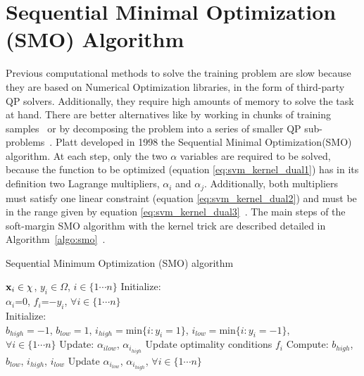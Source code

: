\documentclass{llncs}
\begin{document}
\section{Sequential Minimal Optimization (SMO) Algorithm }
\label{sec:svm_smo}
Previous computational methods to solve the training problem are slow because they are based on Numerical Optimization libraries, in the form of third-party QP solvers. Additionally, they require high amounts of memory to solve the task at hand. There are better alternatives like by working in chunks of training samples~\cite{Vapnik1995} or by decomposing the problem into a series of smaller QP sub-problems~\cite{Osuna1997,Platt1998}.
Platt developed in 1998 the Sequential Minimal Optimization(SMO) algorithm.
At each step, only the two $\alpha$ variables are required to be solved, because the function to be optimized (equation \ref{eq:svm_kernel_dual1}) has in its definition
two Lagrange multipliers, $\alpha_i$ and $\alpha_j$. Additionally, both multipliers must satisfy one linear constraint (equation \ref{eq:svm_kernel_dual2}) and must be in the range given by equation \ref{eq:svm_kernel_dual3}~\cite{Platt1998,Catanzaro2008}.
The main steps of the soft-margin \ac{SMO} algorithm with the kernel trick are described detailed in Algorithm~\ref{algo:smo}~\cite{Catanzaro2008,L.J.Cao2006}.
\begin{algorithm}
\caption{Sequential Minimum Optimization (SMO) algorithm}
\label{algo:smo}
\begin{algorithmic}[1]
\REQUIRE ${\mathbf x}_i\in\chi$, $y_i\in\Omega$, $i\in\{1\cdots n\}$
\STATE Initialize: \\
$\alpha_i$=0, $f_i$=$-y_i$, $\forall i \in\{1\cdots n\}$ \\
\STATE Initialize: \\
$ b_{high} = -1 $, $ b_{low} = 1 $, $ i_{high} = \text{min}\{i:y_i=1\} $, $ i_{low} = \text{min}\{i:y_i=-1\}$, \\ $\forall i \in\{1\cdots n\}$
\STATE Update: $\alpha_{i{low}}$, $\alpha_{i_{high}}$
\REPEAT
	\STATE Update optimality conditions $f_i$
	\STATE Compute: $b_{high}$, $b_{low}$, $i_{high}$, $i_{low}$
	\STATE Update $\alpha_{i_{low}}$, $\alpha_{i_{high}}$, $\forall i \in\{1\cdots n\}$
\end{algorithmic}
\end{algorithm}
\end{document}

